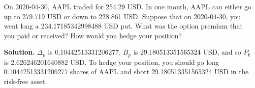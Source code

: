 \noindent On 2020-04-30, AAPL traded for 254.29 USD. In one month, AAPL can either go up to 279.719 USD or down to 228.861 USD. Suppose that on 2020-04-30, you went long a 234.17185342998488 USD put. What was the option premium that you paid or received? How would you hedge your position?

\vspace{9pt}

\noindent\textbf{Solution.} $\Delta_{p}$ is 0.10442513331206277, $B_{p}$ is 29.180513351565324 USD, and so $P_{0}$ is 2.626246201640882 USD. To hedge your position, you should go long 0.10442513331206277 shares of AAPL and short 29.180513351565324 USD in the risk-free asset.